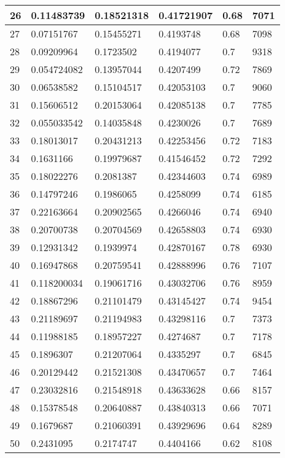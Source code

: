 \begin{longtable}{|l|l|l|l|l|l|}
26 & 0.11483739 & 0.18521318 & 0.41721907 & 0.68 & 7071 \\ \hline 
27 & 0.07151767 & 0.15455271 & 0.4193748 & 0.68 & 7098 \\ \hline 
28 & 0.09209964 & 0.1723502 & 0.4194077 & 0.7 & 9318 \\ \hline 
29 & 0.054724082 & 0.13957044 & 0.4207499 & 0.72 & 7869 \\ \hline 
30 & 0.06538582 & 0.15104517 & 0.42053103 & 0.7 & 9060 \\ \hline 
31 & 0.15606512 & 0.20153064 & 0.42085138 & 0.7 & 7785 \\ \hline 
32 & 0.055033542 & 0.14035848 & 0.4230026 & 0.7 & 7689 \\ \hline 
33 & 0.18013017 & 0.20431213 & 0.42253456 & 0.72 & 7183 \\ \hline 
34 & 0.1631166 & 0.19979687 & 0.41546452 & 0.72 & 7292 \\ \hline 
35 & 0.18022276 & 0.2081387 & 0.42344603 & 0.74 & 6989 \\ \hline 
36 & 0.14797246 & 0.1986065 & 0.4258099 & 0.74 & 6185 \\ \hline 
37 & 0.22163664 & 0.20902565 & 0.4266046 & 0.74 & 6940 \\ \hline 
38 & 0.20700738 & 0.20704569 & 0.42658803 & 0.74 & 6930 \\ \hline 
39 & 0.12931342 & 0.1939974 & 0.42870167 & 0.78 & 6930 \\ \hline 
40 & 0.16947868 & 0.20759541 & 0.42888996 & 0.76 & 7107 \\ \hline 
41 & 0.118200034 & 0.19061716 & 0.43032706 & 0.76 & 8959 \\ \hline 
42 & 0.18867296 & 0.21101479 & 0.43145427 & 0.74 & 9454 \\ \hline 
43 & 0.21189697 & 0.21194983 & 0.43298116 & 0.7 & 7373 \\ \hline 
44 & 0.11988185 & 0.18957227 & 0.4274687 & 0.7 & 7178 \\ \hline 
45 & 0.1896307 & 0.21207064 & 0.4335297 & 0.7 & 6845 \\ \hline 
46 & 0.20129442 & 0.21521308 & 0.43470657 & 0.7 & 7464 \\ \hline 
47 & 0.23032816 & 0.21548918 & 0.43633628 & 0.66 & 8157 \\ \hline 
48 & 0.15378548 & 0.20640887 & 0.43840313 & 0.66 & 7071 \\ \hline 
49 & 0.1679687 & 0.21060391 & 0.43929696 & 0.64 & 8289 \\ \hline 
50 & 0.2431095 & 0.2174747 & 0.4404166 & 0.62 & 8108 \\ \hline 
\end{longtable}